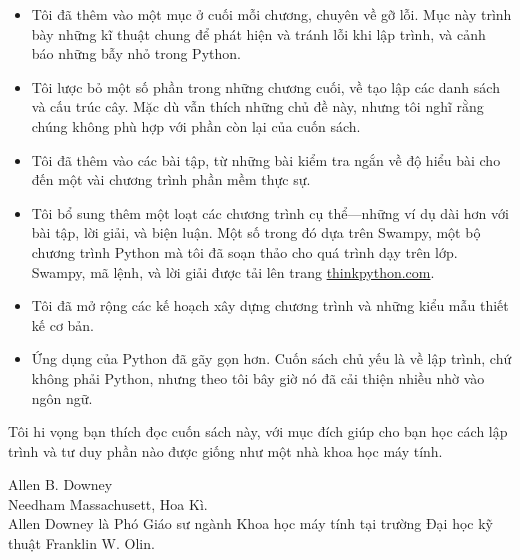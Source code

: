 \documentclass[11pt]{book}
\begin{document}
\begin{itemize}

\item Tôi đã thêm vào một mục ở cuối mỗi chương, chuyên về gỡ lỗi.
  Mục này trình bày những kĩ thuật chung để phát hiện và tránh
  lỗi khi lập trình, và cảnh báo những bẫy nhỏ trong Python.

\item Tôi lược bỏ một số phần trong những chương cuối, về tạo lập
  các danh sách và cấu trúc cây. Mặc dù vẫn thích những chủ đề này,
  nhưng tôi nghĩ rằng chúng không phù hợp với phần còn lại
  của cuốn sách.

\item Tôi đã thêm vào các bài tập, từ những bài kiểm tra ngắn về
  độ hiểu bài cho đến một vài chương trình phần mềm thực sự.
  
\item Tôi bổ sung thêm một loạt các chương trình cụ thể---những ví dụ dài hơn 
  với bài tập, lời giải, và biện luận. Một số trong đó dựa trên Swampy,
  một bộ chương trình Python mà tôi đã soạn thảo cho quá trình
  dạy trên lớp. Swampy, mã lệnh, và lời giải được tải lên trang 
  \url{thinkpython.com}.
  
\item Tôi đã mở rộng các kế hoạch xây dựng chương trình và những 
  kiểu mẫu thiết kế cơ bản.

\item Ứng dụng của Python đã gãy gọn hơn. Cuốn sách chủ yếu là về lập trình,
  chứ không phải Python, nhưng theo tôi bây giờ nó đã cải thiện nhiều
  nhờ vào ngôn ngữ.

\end{itemize}

Tôi hi vọng bạn thích đọc cuốn sách này, với mục đích giúp cho
bạn học cách lập trình và tư duy phần nào được 
giống như một nhà khoa học máy tính.

Allen B. Downey \\
Needham Massachusett, Hoa Kì.\\

Allen Downey là Phó Giáo sư ngành Khoa học máy tính tại  
trường Đại học kỹ thuật Franklin W. Olin.




\end{document}

